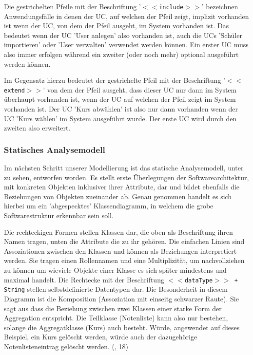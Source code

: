 Die gestrichelten Pfeile mit der Beschriftung '\texttt{$<<$include$>>$}' bezeichnen Anwendungsfälle in denen der \ac{UC}, auf welchen der Pfeil zeigt, implizit vorhanden ist wenn der \ac{UC}, von dem der Pfeil ausgeht, im System vorhanden ist. Das bedeutet wenn der \ac{UC} 'User anlegen' also vorhanden ist, auch die \ac{UC}s 'Schüler importieren' oder 'User verwalten' verwendet werden können. Ein erster \ac{UC} muss also immer erfolgen während ein zweiter (oder noch mehr) optional ausgeführt werden können.

Im Gegensatz hierzu bedeutet der gestrichelte Pfeil mit der Beschriftung '\texttt{$<<$extend$>>$}' von dem der Pfeil ausgeht, dass dieser \ac{UC} nur dann im System überhaupt vorhanden ist, wenn der \ac{UC} auf welchen der Pfeil zeigt im System vorhanden ist. Der \ac{UC} 'Kurs abwählen' ist also nur dann vorhanden wenn der \ac{UC} 'Kurs wählen' im System ausgeführt wurde. Der erste \ac{UC} wird durch den zweiten also erweitert.

\subsubsection{Statisches Analysemodell}

Im nächsten Schritt unserer Modellierung ist das statische Analysemodell, unter  zu sehen, entworfen worden. Es stellt erste Überlegungen der Softwarearchitektur, mit konkreten Objekten inklusiver ihrer Attribute, dar und bildet ebenfalls die Beziehungen von Objekten zueinander ab. Genau genommen handelt es sich hierbei um ein 'abgespecktes' Klassendiagramm, in welchem die grobe Softwarestruktur erkennbar sein soll.

Die rechteckigen Formen stellen Klassen dar, die oben als Beschriftung ihren Namen tragen, unten die Attribute die zu ihr gehören. Die einfachen Linien sind Assoziationen zwischen den Klassen und können als Beziehungen interpretiert werden. Sie tragen einen Rollennamen und eine Multiplizität, um nachvollziehen zu können um wieviele Objekte einer Klasse es sich später mindestens und maximal handelt.
Die Rechtecke mit der Beschriftung \texttt{$<<$dataType$>>$ + String} stellen selbstdefinierte Datentypen dar.
Die Besonderheit in diesem Diagramm ist die Komposition (Assoziation mit einseitg schwarzer Raute). Sie sagt aus dass die Beziehung zwischen zwei Klassen einer starke Form der Aggregation entspricht. Die Teilklasse (Notenliste) kann also nur bestehen, solange die Aggregatklasse (Kurs) auch besteht. Würde, angewendet auf dieses Beispiel, ein Kurs gelöscht werden, würde auch der dazugehörige Notenlisteneintrag gelöscht werden. (\cite{BalzertH_UML2}, 18)

